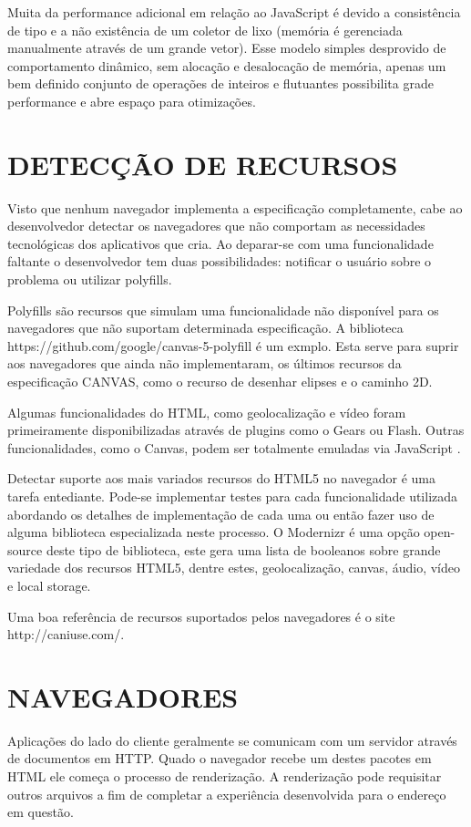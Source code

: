 \documentclass[
12pt,
a4paper,
portuges,
draft
]{report}
\begin{document}
Muita da performance adicional em relação ao JavaScript é devido
a consistência de tipo e a não existência de um coletor de lixo
(memória é gerenciada manualmente através de um grande vetor). Esse
modelo simples desprovido de comportamento dinâmico, sem alocação
e desalocação de memória, apenas um bem definido conjunto de
operações de inteiros e flutuantes possibilita grade performance e
abre espaço para otimizações.


\section{DETECÇÃO DE RECURSOS}

Visto que nenhum navegador implementa a especificação completamente,
cabe ao desenvolvedor detectar os navegadores que não comportam as
necessidades tecnológicas dos aplicativos que cria. Ao deparar-se com uma funcionalidade
faltante o desenvolvedor tem duas possibilidades: notificar o usuário sobre o
problema ou utilizar polyfills.

Polyfills são recursos que simulam uma funcionalidade não disponível para
os navegadores que não suportam determinada especificação. A biblioteca
https://github.com/google/canvas-5-polyfill é um exmplo. Esta serve para
suprir aos navegadores que ainda não implementaram, os últimos recursos
da especificação CANVAS, como o recurso de desenhar elipses e o caminho 2D.

Algumas funcionalidades do HTML, como geolocalização e vídeo foram primeiramente
disponibilizadas através de plugins como o Gears ou Flash. Outras funcionalidades, como o Canvas, podem ser totalmente emuladas via JavaScript \autocite{diveIntohtml}.

Detectar suporte aos mais variados recursos do HTML5 no navegador
é uma tarefa entediante. Pode-se implementar testes para
cada funcionalidade utilizada abordando os detalhes de implementação
de cada uma ou então fazer uso de alguma biblioteca especializada
neste processo. O Modernizr é uma opção open-source deste tipo de
biblioteca, este gera uma lista de booleanos sobre grande variedade dos
recursos HTML5, dentre estes, geolocalização, canvas, áudio, vídeo e
local storage.

Uma boa referência de recursos suportados pelos navegadores é o site
http://caniuse.com/.

\section{NAVEGADORES}
Aplicações do lado do cliente geralmente se comunicam com um
servidor através de documentos em HTTP. Quado o navegador recebe um
destes pacotes em HTML ele começa o processo de renderização. A
renderização pode requisitar outros arquivos a fim de completar a
experiência desenvolvida para o endereço em questão.
\end{document}
